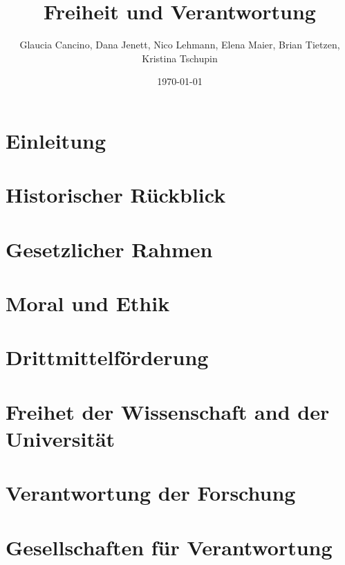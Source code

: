 \documentclass[12pt]{beamer}
\begin{document}
\title{Freiheit und Verantwortung} 
\author[]{Glaucia Cancino, Dana Jenett, Nico Lehmann, Elena Maier, Brian Tietzen, Kristina Tschupin}

\date{\today} 

\frame{\titlepage}




\section{Einleitung}


\section{Historischer Rückblick}


\section{Gesetzlicher Rahmen}


\section{Moral und Ethik}


\section{Drittmittelförderung}


\section{Freihet der Wissenschaft and der Universität}


\section{Verantwortung der Forschung}


\section{Gesellschaften für Verantwortung}



\printbibliography
\end{document}

